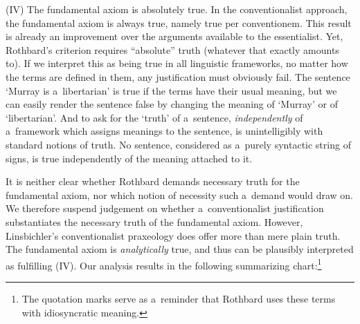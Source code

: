 (IV) The fundamental axiom is absolutely true. In the conventionalist approach, the fundamental axiom is always true, namely true per conventionem. This result is already an improvement over the arguments available to the essentialist. Yet, Rothbard's criterion requires ``absolute'' truth (whatever that exactly amounts to). If we interpret this as being true in all linguistic frameworks, no matter how the terms are defined in them, any justification must obviously fail. The sentence ‘Murray is a~libertarian' is true if the terms have their usual meaning, but we can easily render the sentence false by changing the meaning of ‘Murray' or of ‘libertarian'. And to ask for the ‘truth' of a~sentence, \textit{independently} of a~framework which assigns meanings to the sentence, is unintelligibly with standard notions of truth. No sentence, considered as a~purely syntactic string of signs, is true independently of the meaning attached to it.



It is neither clear whether Rothbard demands necessary truth for the fundamental axiom, nor which notion of necessity such a~demand would draw on. We therefore suspend judgement on whether a~conventionalist justification substantiates the necessary truth of the fundamental axiom. However, Linsbichler's conventionalist praxeology does offer more than mere plain truth. The fundamental axiom is \textit{analytically} true, and thus can be plausibly interpreted as fulfilling (IV). Our analysis results in the following summarizing chart:\footnote{The quotation marks serve as a~reminder that Rothbard uses these terms with idiosyncratic meaning.}







